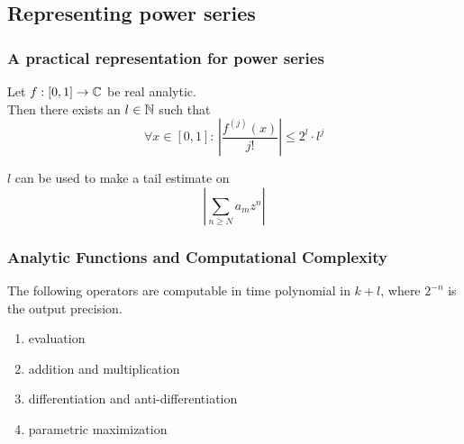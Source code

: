 
\subsection{Representing power series}
\begin{frame}
\frametitle{A practical representation for power series}
\begin{lemma}
  Let $f : [0,1] \to \mathbb{C}$ be real analytic.\\
  Then there exists an $l \in \mathbb{N}$ such that 
  $$ \forall x \in [0,1]: \, \left | \frac{f^{(j)}(x)}{j!} \right | \leq 2^l\cdot l^j $$
\end{lemma}
\pause
$l$ can be used to make a tail estimate on
$$ \left | \sum_{n \geq N} a_m z^n \right |  $$
\end{frame}
\begin{frame}[<+->]
\frametitle{Analytic Functions and Computational Complexity}
\begin{theorem}
  The following operators are computable in time polynomial in $k+l$, where $2^{-n}$ is the output precision.
\begin{enumerate}
\item evaluation
\item addition and multiplication
\item differentiation and anti-differentiation
\item parametric maximization
\end{enumerate}
\end{theorem}
\end{frame}
